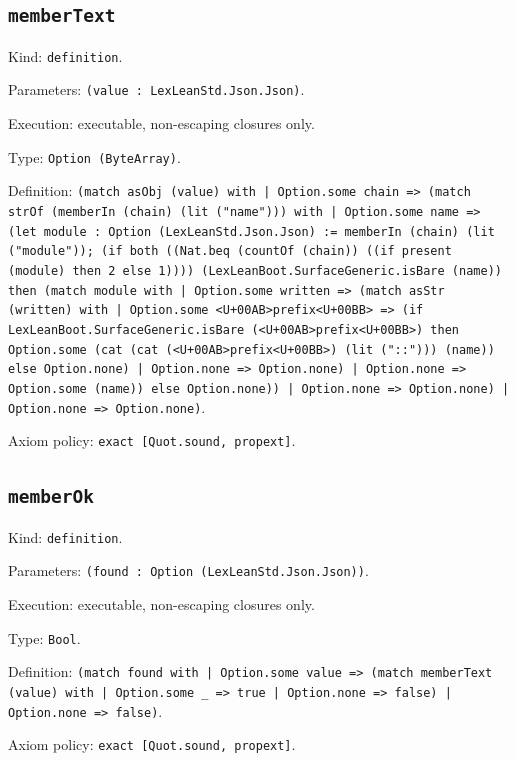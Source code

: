 \documentclass[11pt]{article}
\begin{document}
\subsection*{\texttt{memberText}}
\noindent Kind: \texttt{definition}.\par
\noindent Parameters: \texttt{(value : LexLeanStd.Json.Json)}.\par
\noindent Execution: executable, non-escaping closures only.\par
\noindent Type: \texttt{Option (ByteArray)}.\par
\noindent Definition: \texttt{(match asObj (value) with | Option.some chain => (match strOf (memberIn (chain) (lit ("name"))) with | Option.some name => (let module : Option (LexLeanStd.Json.Json) := memberIn (chain) (lit ("module")); (if both ((Nat.beq (countOf (chain)) ((if present (module) then 2 else 1)))) (LexLeanBoot.SurfaceGeneric.isBare (name)) then (match module with | Option.some written => (match asStr (written) with | Option.some <U+00AB>prefix<U+00BB> => (if LexLeanBoot.SurfaceGeneric.isBare (<U+00AB>prefix<U+00BB>) then Option.some (cat (cat (<U+00AB>prefix<U+00BB>) (lit ("::"))) (name)) else Option.none) | Option.none => Option.none) | Option.none => Option.some (name)) else Option.none)) | Option.none => Option.none) | Option.none => Option.none)}.\par
\noindent Axiom policy: \texttt{exact [Quot.sound, propext]}.\par
\subsection*{\texttt{memberOk}}
\noindent Kind: \texttt{definition}.\par
\noindent Parameters: \texttt{(found : Option (LexLeanStd.Json.Json))}.\par
\noindent Execution: executable, non-escaping closures only.\par
\noindent Type: \texttt{Bool}.\par
\noindent Definition: \texttt{(match found with | Option.some value => (match memberText (value) with | Option.some \_ => true | Option.none => false) | Option.none => false)}.\par
\noindent Axiom policy: \texttt{exact [Quot.sound, propext]}.\par
\end{document}
